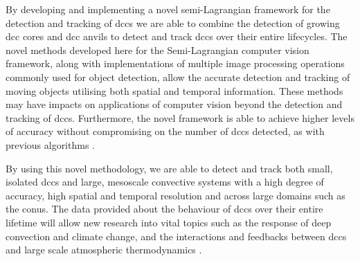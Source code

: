 By developing and implementing a novel semi-Lagrangian framework for the detection and tracking of \acrshort{dcc}s we are able to combine the detection of growing \acrshort{dcc} cores \citep{zinner_cb-tram:_2008} and \acrshort{dcc} anvils \citep{muller_role_2018} to detect and track \acrshort{dcc}s over their entire lifecycles.
The novel methods developed here for the Semi-Lagrangian computer vision framework, along with implementations of multiple image processing operations commonly used for object detection, allow the accurate detection and tracking of moving objects utilising both spatial and temporal information.
These methods may have impacts on applications of computer vision beyond the detection and tracking of \acrshort{dcc}s.
Furthermore, the novel framework is able to achieve higher levels of accuracy without compromising on the number of \acrshort{dcc}s detected, as with previous algorithms \citep{muller_novel_2019}.



By using this novel methodology, we are able to detect and track both small, isolated \acrshort{dcc}s and large, mesoscale convective systems with a high degree of accuracy, high spatial and temporal resolution and across large domains such as the \acrshort{conus}.
The data provided about the behaviour of \acrshort{dcc}s over their entire lifetime will allow new research into vital topics such as the response of deep convection and climate change, and the interactions and feedbacks between \acrshort{dcc}s and large scale atmospheric thermodynamics \citep{varble_erroneous_2018}.





